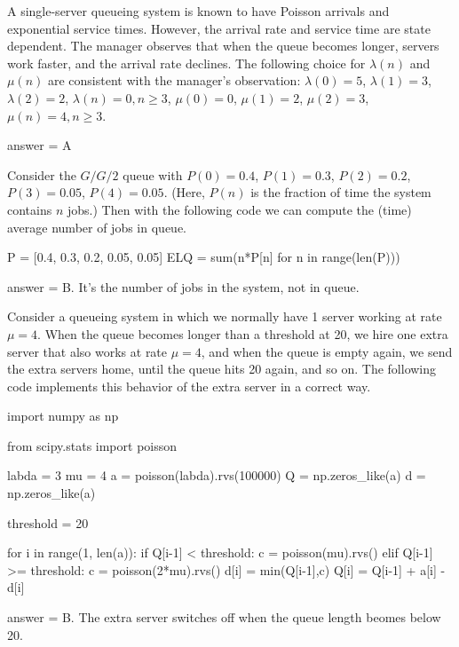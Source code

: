 \begin{exercise}[201903]
 A single-server queueing system is known to have Poisson
  arrivals and exponential service times. However, the arrival rate
  and service time are state dependent. The manager observes that when the queue becomes longer,
  servers work faster, and the arrival rate declines. The following choice for $\lambda(n)$ and $\mu(n)$ are consistent with the manager's observation:
  $\lambda(0) = 5$, $\lambda(1)=3$, $\lambda(2)=2$,
  $\lambda(n)=0, n\geq 3$, $\mu(0) = 0$, $\mu(1)=2$, $\mu(2)=3$, $\mu(n)=4, n\geq 3$. 

\begin{solution}
answer = A
\end{solution}
\end{exercise}

\begin{exercise}[201903]
  Consider the $G/G/2$ queue with $P(0) = 0.4$, $P(1)=0.3$, $P(2)= 0.2$, $P(3)=0.05$, $P(4)=0.05$. (Here, $P(n)$ is the fraction of time the system contains $n$ jobs.)
Then with the following code we can compute the (time) average number of jobs in queue.
\begin{pyconsole}
P = [0.4, 0.3, 0.2, 0.05, 0.05]
ELQ = sum(n*P[n] for n in range(len(P)))
\end{pyconsole}

\begin{solution}
answer = B. It's the number of jobs in the system, not in queue.
\end{solution}
\end{exercise}

\begin{exercise}[201903]
  Consider a queueing system in which we normally have 1 server working at rate $\mu=4$.
  When the queue becomes longer than a threshold at 20, we hire one extra server that also works at rate $\mu=4$, and when the queue is empty again, we send the extra servers home, until the queue hits 20 again, and so on.
  The following code implements this behavior of the extra server in a correct way.

    \begin{pyverbatim}
import numpy as np

from scipy.stats import poisson

labda = 3
mu = 4
a = poisson(labda).rvs(100000)
Q = np.zeros_like(a)
d = np.zeros_like(a)

threshold = 20

for i in range(1, len(a)):
    if Q[i-1] < threshold:
        c = poisson(mu).rvs()
    elif Q[i-1] >= threshold:
        c = poisson(2*mu).rvs()
    d[i] = min(Q[i-1],c)
    Q[i] = Q[i-1] + a[i] - d[i]
    
    \end{pyverbatim}

\begin{solution}
answer = B. The extra server switches off when the queue length beomes below 20.
\end{solution}
\end{exercise}

